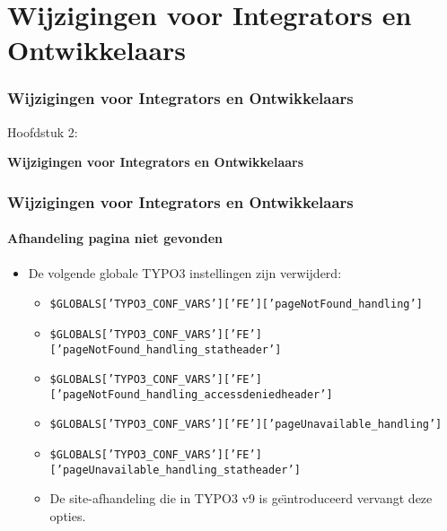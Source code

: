 %

\section{Wijzigingen voor Integrators en Ontwikkelaars}
\begin{frame}[fragile]
	\frametitle{Wijzigingen voor Integrators en Ontwikkelaars}

	\begin{center}\huge{Hoofdstuk 2:}\end{center}
	\begin{center}\huge{\color{typo3darkgrey}\textbf{Wijzigingen voor Integrators en Ontwikkelaars}}\end{center}

\end{frame}


\begin{frame}[fragile]
	\frametitle{Wijzigingen voor Integrators en Ontwikkelaars}
	\framesubtitle{Afhandeling pagina niet gevonden}

	\begin{itemize}

		\item De volgende globale TYPO3 instellingen zijn verwijderd:

			\begin{itemize}
				\item {\fontsize{7}{8}\selectfont\texttt{\$GLOBALS['TYPO3\_CONF\_VARS']['FE']['pageNotFound\_handling']}}
				\item {\fontsize{7}{8}\selectfont\texttt{\$GLOBALS['TYPO3\_CONF\_VARS']['FE']['pageNotFound\_handling\_statheader']}}
				\item {\fontsize{7}{8}\selectfont\texttt{\$GLOBALS['TYPO3\_CONF\_VARS']['FE']['pageNotFound\_handling\_accessdeniedheader']}}
				\item {\fontsize{7}{8}\selectfont\texttt{\$GLOBALS['TYPO3\_CONF\_VARS']['FE']['pageUnavailable\_handling']}}
				\item {\fontsize{7}{8}\selectfont\texttt{\$GLOBALS['TYPO3\_CONF\_VARS']['FE']['pageUnavailable\_handling\_statheader']}}
			\end{itemize}

			\begin{itemize}\smaller
				\item[\ding{228}] De site-afhandeling die in TYPO3 v9 is ge\"{\i}ntroduceerd vervangt deze opties.
			\end{itemize}\normalsize

	\end{itemize}

\end{frame}

